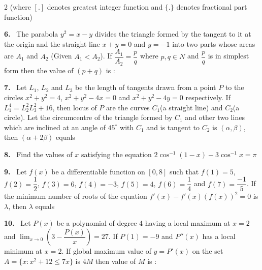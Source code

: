 \documentclass[10pt]{extarticle}
\newcommand{\qn}[1]{\par\smallskip\noindent\textbf{#1.}~}
\begin{document}
\begin{multicols}{2}
(where $[.]$ denotes greatest integer function and $\{.\}$ denotes fractional part function)
\qn{6} The parabola $y^2=x-y$ divides the triangle formed by the tangent to it at the origin and the straight line $x+y=0$ and $y=-1$ into two parts whose areas are $A_1$ and $A_2$ (Given $A_1<A_2$). If $\dfrac{A_1}{A_2}=\dfrac pq$ where $p,q\in N$ and $\dfrac pq$ is in simplest form then the value of $(p+q)$ is :
\qn{7} Let $L_1$, $L_2$ and $L_3$ be the length of tangents drawn from a point $P$ to the circles $x^2+y^2=4$, $x^2+y^2-4x=0$ and $x^2+y^2-4y=0$ respectively. If $L_1^4=L_2^2L_3^2+16$, then locus of $P$ are the curves $C_1$(a straight line) and $C_2$(a circle). Let the circumcentre of the triangle formed by $C_1$ and other two lines which are inclined at an angle of $45^\circ$ with $C_1$ and is tangent to $C_2$ is $(\alpha,\beta)$, then $(\alpha+2\beta)$ equals
\qn{8} Find the values of $x$ satisfying the equation $2\cos^{-1}(1-x)-3\cos^{-1}x=\pi$
\qn{9} Let $f(x)$ be a differentiable function on $[0,8]$ such that $f(1)=5$, $f(2)=\dfrac12$, $f(3)=6$, $f(4)=-3$, $f(5)=4$, $f(6)=\dfrac14$ and $f(7)=\dfrac{-1}5$. If the minimum number of roots of the equation $f'(x)-f'(x)(f(x))^2=0$ is $\lambda$, then $\lambda$ equals
\qn{10} Let $P(x)$ be a polynomial of degree 4 having a local maximum at $x=2$ and $\displaystyle\lim_{x\to0}\left(3-\dfrac{P(x)}x\right)=27$. If $P(1)=-9$ and $P''(x)$ has a local minimum at $x=2$. If global maximum value of $y=P'(x)$ on the set $A=\{x:x^2+12\leq7x\}$ is $4M$ then value of $M$ is :
\end{multicols}
\end{document}
